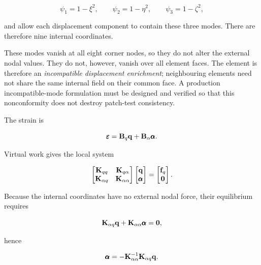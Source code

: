 \begin{equation}
    \psi_1=1-\xi^2,
    \qquad
    \psi_2=1-\eta^2,
    \qquad
    \psi_3=1-\zeta^2,
\end{equation}

and allow each displacement component to contain these three modes. There are
therefore nine internal coordinates.

These modes vanish at all eight corner nodes, so they do not alter the external
nodal values. They do not, however, vanish over all element faces. The element
is therefore an \textit{incompatible displacement enrichment}; neighbouring
elements need not share the same internal field on their common face. A
production incompatible-mode formulation must be designed and verified so that
this nonconformity does not destroy patch-test consistency.

The strain is

\begin{equation}
    \pmb{\varepsilon}
    =\mathbf{B}_q\mathbf{q}
    +\mathbf{B}_{\alpha}\pmb{\alpha}.
\end{equation}

Virtual work gives the local system

\begin{equation}\label{eq:enriched-block-system}
    \begin{bmatrix}
        \mathbf{K}_{qq} & \mathbf{K}_{q\alpha}\\
        \mathbf{K}_{\alpha q} & \mathbf{K}_{\alpha\alpha}
    \end{bmatrix}
    \begin{bmatrix}
        \mathbf{q}\\
        \pmb{\alpha}
    \end{bmatrix}
    =
    \begin{bmatrix}
        \mathbf{f}_q\\
        \mathbf{0}
    \end{bmatrix}.
\end{equation}

Because the internal coordinates have no external nodal force, their equilibrium
requires

\begin{equation}
    \mathbf{K}_{\alpha q}\mathbf{q}
    +\mathbf{K}_{\alpha\alpha}\pmb{\alpha}=\mathbf{0},
\end{equation}

hence

\begin{equation}
    \pmb{\alpha}
    =-\mathbf{K}_{\alpha\alpha}^{-1}
    \mathbf{K}_{\alpha q}\mathbf{q}.
\end{equation}

